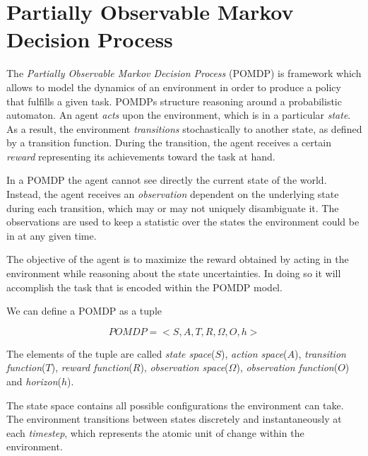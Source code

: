 \section{Partially Observable Markov Decision Process}\label{ref:pomdp}

The \textit{Partially Observable Markov Decision Process} (POMDP) \cite{cit:pomdp} is framework
which allows to model the dynamics of an environment in order to produce a policy that fulfills a
given task. POMDPs structure reasoning around a probabilistic automaton. An agent \textit{acts}
upon the environment, which is in a particular \textit{state}. As a result, the environment
\textit{transitions} stochastically to another state, as defined by a transition function. During
the transition, the agent receives a certain \textit{reward} representing its achievements toward
the task at hand.

In a POMDP the agent cannot see directly the current state of the world. Instead, the agent receives
an \textit{observation} dependent on the underlying state during each transition, which may or may
not uniquely disambiguate it. The observations are used to keep a statistic over the states the
environment could be in at any given time.

The objective of the agent is to maximize the reward obtained by acting in the environment while
reasoning about the state uncertainties. In doing so it will accomplish the task that is encoded
within the POMDP model.

%

We can define a POMDP as a tuple

\begin{equation}
 POMDP = <S,A,T,R,\Omega,O,h>
\end{equation}

The elements of the tuple are called \textit{state space}($S$), \textit{action space}($A$),
\textit{transition function}($T$), \textit{reward function}($R$), \textit{observation
space}($\Omega$), \textit{observation function}($O$) and \textit{horizon}($h$).

The state space contains all possible configurations the environment can take.  The environment
transitions between states discretely and instantaneously at each \textit{timestep}, which
represents the atomic unit of change within the environment.

